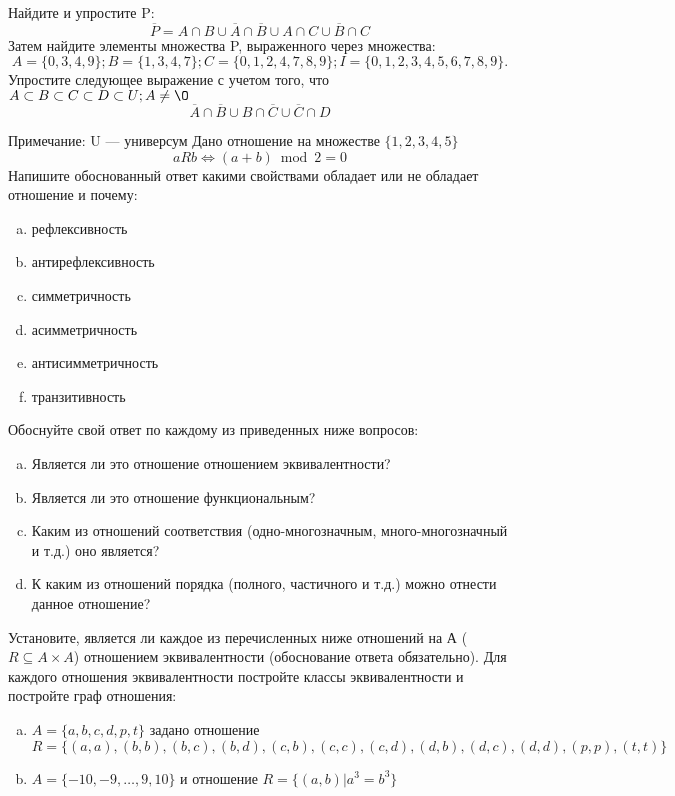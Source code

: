 \documentclass[10pt]{exam}
\begin{document}
\begin{questions}
\question
Найдите и упростите P:
\begin{equation*}
\overline{P} = A \cap B \cup \overline{A} \cap \overline{B} \cup A \cap C \cup \overline{B} \cap C
\end{equation*}
Затем найдите элементы множества P, выраженного через множества:
\begin{equation*}
A = \{0, 3, 4, 9\}; 
B = \{1, 3, 4, 7\};
C = \{0, 1, 2, 4, 7, 8, 9\};
I = \{0, 1, 2, 3, 4, 5, 6, 7, 8, 9\}.
\end{equation*}\question
Упростите следующее выражение с учетом того, что $A\subset B \subset C \subset D \subset U; A \neq \O$
\begin{equation*}
\overline{A} \cap \overline{B} \cup B \cap \overline{C} \cup \overline{C} \cap D
\end{equation*}

Примечание: U — универсум\question
Дано отношение на множестве $\{1, 2, 3, 4, 5\}$ 
\begin{equation*}
aRb \iff (a+b) \bmod 2 =0
\end{equation*}
Напишите обоснованный ответ какими свойствами обладает или не обладает отношение и почему:   
\begin{enumerate} [a)]\setcounter{enumi}{0}
\item рефлексивность
\item антирефлексивность
\item симметричность
\item асимметричность
\item антисимметричность
\item транзитивность
\end{enumerate}

Обоснуйте свой ответ по каждому из приведенных ниже вопросов:
\begin{enumerate} [a)]\setcounter{enumi}{0}
    \item Является ли это отношение отношением эквивалентности?
    \item Является ли это отношение функциональным?
    \item Каким из отношений соответствия (одно-многозначным, много-многозначный и т.д.) оно является?
    \item К каким из отношений порядка (полного, частичного и т.д.) можно отнести данное отношение?
\end{enumerate}



\question
Установите, является ли каждое из перечисленных ниже отношений на А ($R \subseteq A \times A$) отношением эквивалентности (обоснование ответа обязательно). Для каждого отношения эквивалентности постройте классы 
эквивалентности и постройте граф отношения:
\begin{enumerate} [a)]\setcounter{enumi}{0}
\item $A = \{a, b, c, d, p, t\}$ задано отношение $R = \{(a, a), (b, b), (b, c), (b, d), (c, b), (c, c), (c, d), (d, b), (d, c), (d, d), (p,p), (t,t)\}$
\item $A = \{-10, -9, … , 9, 10\}$ и отношение $R = \{(a,b)|a^{3} = b^{3}\}$


\end{enumerate}
\end{questions}
\end{document}
